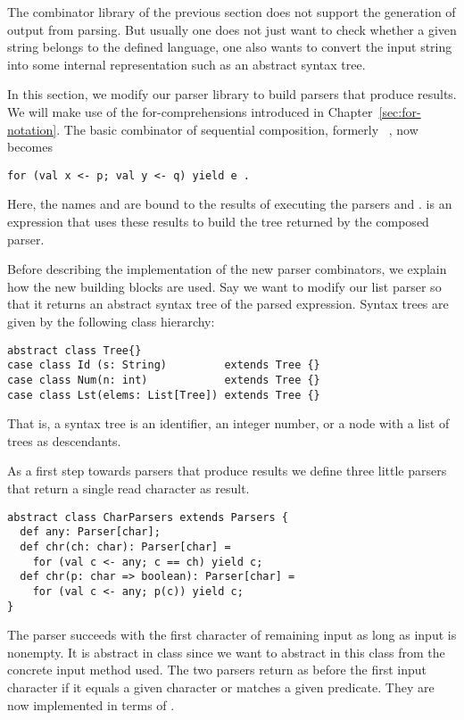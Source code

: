 {The combinator library of the previous section does not support the
generation of output from parsing. But usually one does not just want
to check whether a given string belongs to the defined language, one
also wants to convert the input string into some internal
representation such as an abstract syntax tree.

In this section, we modify our parser library to build parsers that
produce results. We will make use of the for-comprehensions introduced
in Chapter~\ref{sec:for-notation}.  The basic combinator of sequential
composition, formerly ~, now becomes
\begin{lstlisting}
for (val x <- p; val y <- q) yield e .
\end{lstlisting}
Here, the names  and  are bound to the results of
executing the parsers  and .  is an expression
that uses these results to build the tree returned by the composed
parser.

Before describing the implementation of the new parser combinators, we
explain how the new building blocks are used. Say we want to modify
our list parser so that it returns an abstract syntax tree of the
parsed expression. Syntax trees are given by the following class hierarchy:
\begin{lstlisting}
abstract class Tree{}
case class Id (s: String)         extends Tree {}
case class Num(n: int)            extends Tree {}
case class Lst(elems: List[Tree]) extends Tree {}
\end{lstlisting}
That is, a syntax tree is an identifier, an integer number, or a
 node with a list of trees as descendants.

As a first step towards parsers that produce results we define three
little parsers that return a single read character as result.
\begin{lstlisting}
abstract class CharParsers extends Parsers {
  def any: Parser[char];
  def chr(ch: char): Parser[char] = 
    for (val c <- any; c == ch) yield c;
  def chr(p: char => boolean): Parser[char] = 
    for (val c <- any; p(c)) yield c;
}
\end{lstlisting}
The  parser succeeds with the first character of remaining
input as long as input is nonempty. It is abstract in class
 since we want to abstract in this class from the
concrete input method used.  The two  parsers return as before
the first input character if it equals a given character or matches a
given predicate. They are now implemented in terms of .

}
